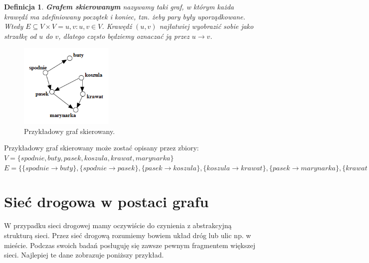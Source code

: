 \documentclass[twoside,12pt]{report}
\newtheorem{definition}{Definicja} %
\begin{document}
\vspace*{30px}
\begin{definition}\label{Graf skierowany}
\textbf{Grafem skierowanym} nazywamy taki graf, w którym każda krawędź ma zdefiniowany początek i koniec, tzn. żeby pary były uporządkowane. Wtedy $E \subseteq V \times V = {{u,v}:u,v \in V}$.
Krawędź $(u,v)$ najłatwiej wyobrazić sobie jako strzałkę od $u$ do $v$, dlatego często będziemy oznaczać ją przez $u \rightarrow v$\cite{grafy}.
\end{definition}

\begin{figure}[ht]
\begin{center}
\includegraphics[width=0.40\textwidth]{img/graf2}
\caption{Przykładowy graf skierowany.} 
\end{center}
\end{figure}

Przykładowy graf skierowany może zostać opisany przez zbiory:
\newline
\begin{math}
V=\{spodnie, buty, pasek, koszula, krawat, marynarka\}
\end{math}
\newline
\begin{math}
E=\{\{spodnie \rightarrow buty\},\{spodnie  \rightarrow pasek\},
	\{pasek \rightarrow koszula\},\{koszula \rightarrow krawat\},
	\{pasek \rightarrow marynarka\},\{krawat \rightarrow marynarka\}\}
\end{math}

\section{Sieć drogowa w postaci grafu}
W przypadku sieci drogowej mamy oczywiście do czynienia z abstrakcyjną strukturą sieci. Przez sieć drogową rozumiemy bowiem układ dróg lub ulic np. w mieście. Podczas swoich badań posługuję się zawsze pewnym fragmentem większej sieci. Najlepiej te dane zobrazuje poniższy przykład.
\end{document}
